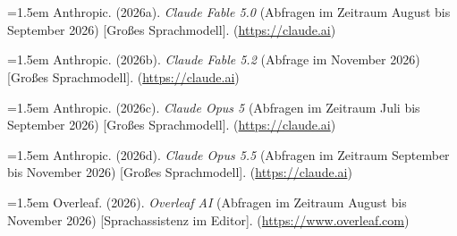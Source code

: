 \newpage
{}
{}
\section*{}

\begingroup
\setlength{\parindent}{0pt}
\setlength{\parskip}{0.7em}

\hangindent=1.5em
Anthropic. (2026a). \textit{Claude Fable 5.0} (Abfragen im Zeitraum August bis September 2026) [Gro{\ss}es Sprachmodell]. (\url{https://claude.ai})

\hangindent=1.5em
Anthropic. (2026b). \textit{Claude Fable 5.2} (Abfrage im November 2026) [Gro{\ss}es Sprachmodell]. (\url{https://claude.ai})

\hangindent=1.5em
Anthropic. (2026c). \textit{Claude Opus 5} (Abfragen im Zeitraum Juli bis September 2026) [Gro{\ss}es Sprachmodell]. (\url{https://claude.ai})

\hangindent=1.5em
Anthropic. (2026d). \textit{Claude Opus 5.5} (Abfragen im Zeitraum September bis November 2026) [Gro{\ss}es Sprachmodell]. (\url{https://claude.ai})

\hangindent=1.5em
Overleaf. (2026). \textit{Overleaf AI} (Abfragen im Zeitraum August bis November 2026) [Sprachassistenz im Editor]. (\url{https://www.overleaf.com})

\endgroup
